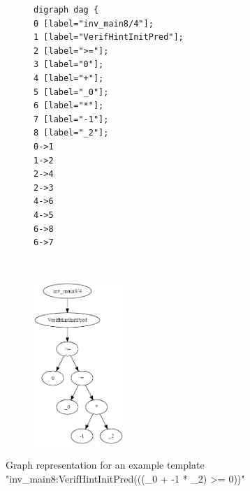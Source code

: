\documentclass{article}
\begin{document}
\begin{figure}[h]
\centering
\begin{subfigure}{0.3\textwidth}
\begin{lstlisting}
digraph dag {
0 [label="inv_main8/4"];
1 [label="VerifHintInitPred"];
2 [label=">="];
3 [label="0"];
4 [label="+"];
5 [label="_0"];
6 [label="*"];
7 [label="-1"];
8 [label="_2"];
0->1
1->2
2->4
2->3
4->6
4->5
6->8
6->7
\end{lstlisting}\label{templateGraphviz}
\end{subfigure}   ~~~~~~~~~~~~
\begin{subfigure}{0.3\textwidth}
  \includegraphics[width=3.4cm]{graph/template_graph}\\
  \label{templateGraph}
  \end{subfigure}
  \caption{Graph representation for an example template "inv\_main8:VerifHintInitPred(((\_0 + -1 * \_2) >= 0))"}
\end{figure}
\end{document}
